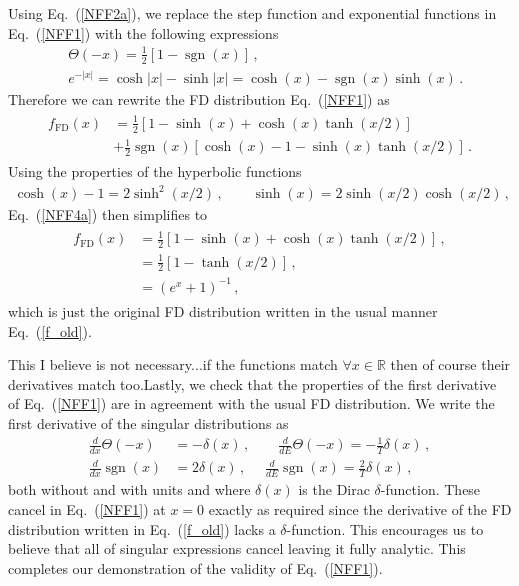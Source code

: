 \documentclass[sn-mathphys,Numbered]{sn-jnl}
\newcommand{\req}[1]{Eq.~(\ref{#1})}
\DeclareMathOperator{\sgn}{sgn}
\newcommand{\rev}[1]{{\color{blue}#1}}
\begin{document}
Using \req{NFF2a}, we replace the step function and exponential functions in \req{NFF1} with the following expressions
\begin{align}
\label{NFF4}
&\Theta(-x)=\frac 1 2 [1-\sgn(x)]\,,\\ 
&e^{-|x|}=\cosh|x|-\sinh|x|=\cosh(x)- \sgn(x)\sinh(x)\,.
\end{align}
Therefore we can rewrite the FD distribution \req{NFF1} as
\begin{align}
\begin{split}
\label{NFF4a}
f_\mathrm{FD}(x)&=\frac{1}{2}\left[1-\sinh(x)+\cosh(x)\tanh(x/2)\right]\\
&+\frac{1}{2}\sgn(x)\left[\cosh(x)-1-\sinh(x)\tanh(x/2)\right]\,.
\end{split}
\end{align}
Using the properties of the hyperbolic functions
\begin{align}
\cosh(x)-1=2\sinh^2(x/2)\,,\qquad
\sinh(x)=2\sinh(x/2)\cosh(x/2)\,,
\end{align}
\req{NFF4a} then simplifies to
\begin{align}
\begin{split}
\label{NFF4b}
f_\mathrm{FD}(x)
&=\frac{1}{2}\left[1-\sinh(x)+\cosh(x)\tanh(x/2)\right]\,,\\
&=\frac{1}{2}\left[1-\tanh(x/2)\right]\,,\\
&=\left(e^{x}+1\right)^{-1}\,,
\end{split}
\end{align}
which is just the original FD distribution written in the usual manner \req{f_old}.

\rev{This I believe is not necessary...if the functions match $\forall x \in \mathbb{R}$ then of course their derivatives match too.}Lastly, we check that the properties of the first derivative of \req{NFF1} are in agreement with the usual FD distribution. We write the first derivative of the singular distributions as 
\begin{align}
\label{NFF1b}
\frac{d}{dx}\Theta(-x)&=-\delta(x)\,,\qquad 
\frac{d}{dE}\Theta(-x)=-\frac{1}{T}\delta(x)\,,\\
\frac{d}{dx}\sgn(x)&=2\delta(x)\,,\,\,\quad 
\frac{d}{dE}\sgn(x)=\frac{2}{T}\delta(x)\,,
\end{align}
both without and with units and where $\delta(x)$ is the Dirac $\delta$-function. These cancel in \req{NFF1} at $x=0$ exactly as required since the derivative of the FD distribution written in \req{f_old} lacks a $\delta$-function. This encourages us to believe that all of singular expressions cancel leaving it fully analytic. This completes our demonstration of the validity of \req{NFF1}. 
\end{document}
